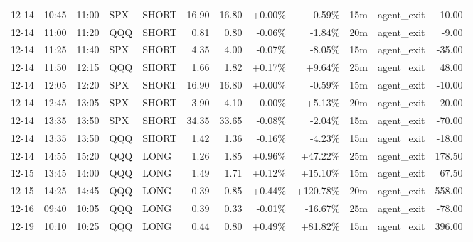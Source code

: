 \documentclass[11pt,a4paper]{article}
\begin{document}
\begin{center}
\begin{longtable}{>{\color{txtmain}}l l l l l r r r r r >{\color{txtmain}}l r}
12-14 & 10:45 & 11:00 & SPX & SHORT & 16.90 & 16.80 & \textcolor{wingreen}{+0.00\%} & \textcolor{lossred}{-0.59\%} & 15m & agent\_exit & \textcolor{lossred}{-10.00} \\
12-14 & 11:00 & 11:20 & QQQ & SHORT & 0.81 & 0.80 & \textcolor{lossred}{-0.06\%} & \textcolor{lossred}{-1.84\%} & 20m & agent\_exit & \textcolor{lossred}{-9.00} \\
12-14 & 11:25 & 11:40 & SPX & SHORT & 4.35 & 4.00 & \textcolor{lossred}{-0.07\%} & \textcolor{lossred}{-8.05\%} & 15m & agent\_exit & \textcolor{lossred}{-35.00} \\
12-14 & 11:50 & 12:15 & QQQ & SHORT & 1.66 & 1.82 & \textcolor{wingreen}{+0.17\%} & \textcolor{wingreen}{+9.64\%} & 25m & agent\_exit & \textcolor{wingreen}{48.00} \\
12-14 & 12:05 & 12:20 & SPX & SHORT & 16.90 & 16.80 & \textcolor{wingreen}{+0.00\%} & \textcolor{lossred}{-0.59\%} & 15m & agent\_exit & \textcolor{lossred}{-10.00} \\
12-14 & 12:45 & 13:05 & SPX & SHORT & 3.90 & 4.10 & \textcolor{lossred}{-0.00\%} & \textcolor{wingreen}{+5.13\%} & 20m & agent\_exit & \textcolor{wingreen}{20.00} \\
12-14 & 13:35 & 13:50 & SPX & SHORT & 34.35 & 33.65 & \textcolor{lossred}{-0.08\%} & \textcolor{lossred}{-2.04\%} & 15m & agent\_exit & \textcolor{lossred}{-70.00} \\
12-14 & 13:35 & 13:50 & QQQ & SHORT & 1.42 & 1.36 & \textcolor{lossred}{-0.16\%} & \textcolor{lossred}{-4.23\%} & 15m & agent\_exit & \textcolor{lossred}{-18.00} \\
12-14 & 14:55 & 15:20 & QQQ & LONG & 1.26 & 1.85 & \textcolor{wingreen}{+0.96\%} & \textcolor{wingreen}{+47.22\%} & 25m & agent\_exit & \textcolor{wingreen}{178.50} \\
12-15 & 13:45 & 14:00 & QQQ & LONG & 1.49 & 1.71 & \textcolor{wingreen}{+0.12\%} & \textcolor{wingreen}{+15.10\%} & 15m & agent\_exit & \textcolor{wingreen}{67.50} \\
12-15 & 14:25 & 14:45 & QQQ & LONG & 0.39 & 0.85 & \textcolor{wingreen}{+0.44\%} & \textcolor{wingreen}{+120.78\%} & 20m & agent\_exit & \textcolor{wingreen}{558.00} \\
12-16 & 09:40 & 10:05 & QQQ & LONG & 0.39 & 0.33 & \textcolor{lossred}{-0.01\%} & \textcolor{lossred}{-16.67\%} & 25m & agent\_exit & \textcolor{lossred}{-78.00} \\
12-19 & 10:10 & 10:25 & QQQ & LONG & 0.44 & 0.80 & \textcolor{wingreen}{+0.49\%} & \textcolor{wingreen}{+81.82\%} & 15m & agent\_exit & \textcolor{wingreen}{396.00} \\

\end{longtable}
\end{center}
\end{document}
